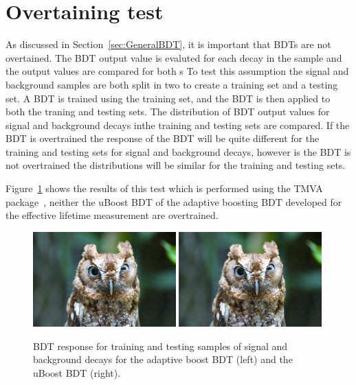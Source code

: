 \section{Overtaining test}
As discussed in Section~\ref{sec:GeneralBDT}, it is important that BDTs are not overtained. %
The BDT output value is evaluted for each decay in the sample and the output values are compared for both s
To test this assumption the signal and background samples are both split in two to create a training set and a testing set.
A BDT is trained using the training set, and the BDT is then applied to both the traning and testing sets. The distribution of BDT output values for signal and background decays inthe training and testing sets are compared. If the BDT is overtrained the response of the BDT will be quite different for the training and testing sets for signal and background decays, however is the BDT is not overtrained the distributions will be similar for the training and testing sets. 

Figure~\ref{fig:ELBDTovertrain} shows the results of this test which is performed using the TMVA package~\cite{Hocker:2007ht}, neither the uBoost BDT of the adaptive boosting BDT developed for the effective lifetime measurement are overtrained. %

\begin{figure}[htbp]
   \centering
        \includegraphics[width=0.49\textwidth]{./Figs/placeholder.jpeg}
        \includegraphics[width=0.49\textwidth]{./Figs/placeholder.jpeg}

    \caption{BDT response for training and testing samples of signal and background decays for the adaptive boost BDT (left) and the uBoost BDT (right). }
    \label{fig:ELBDTovertrain}
\end{figure}



